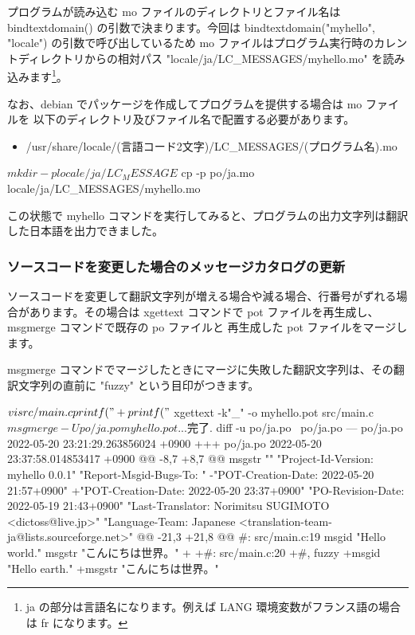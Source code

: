 \documentclass[mingoth,a4paper]{jsarticle}
\begin{document}
プログラムが読み込む mo ファイルのディレクトリとファイル名は bindtextdomain() の引数で決まります。今回は bindtextdomain("myhello", "locale") の引数で呼び出しているため mo ファイルはプログラム実行時のカレントディレクトリからの相対パス "locale/ja/LC\_MESSAGES/myhello.mo" を読み込みます\footnote{ja の部分は言語名になります。例えば LANG 環境変数がフランス語の場合は fr になります。}。

なお、debian でパッケージを作成してプログラムを提供する場合は mo ファイルを 以下のディレクトリ及びファイル名で配置する必要があります。

\begin{itemize}
\item /usr/share/locale/(言語コード2文字)/LC\_MESSAGES/(プログラム名).mo
\end{itemize}

\begin{commandline}
$ mkdir -p locale/ja/LC_MESSAGE
$ cp -p po/ja.mo locale/ja/LC_MESSAGES/myhello.mo  
\end{commandline}

この状態で myhello コマンドを実行してみると、プログラムの出力文字列は翻訳した日本語を出力できました。



\subsubsection{ソースコードを変更した場合のメッセージカタログの更新}

ソースコードを変更して翻訳文字列が増える場合や減る場合、行番号がずれる場合があります。その場合は xgettext コマンドで pot ファイルを再生成し、msgmerge コマンドで既存の po ファイルと 再生成した pot ファイルをマージします。

msgmerge コマンドでマージしたときにマージに失敗した翻訳文字列は、その翻訳文字列の直前に "fuzzy" という目印がつきます。

\begin{commandline}
$ vi src/main.c
     printf("%
+    printf("%
 
$ xgettext -k"_" -o myhello.pot src/main.c
$ msgmerge -U po/ja.po myhello.pot
... 完了.

$ diff -u po/ja.po~ po/ja.po
--- po/ja.po~   2022-05-20 23:21:29.263856024 +0900
+++ po/ja.po    2022-05-20 23:37:58.014853417 +0900
@@ -8,7 +8,7 @@
 msgstr ""
 "Project-Id-Version: myhello 0.0.1\n"
 "Report-Msgid-Bugs-To: \n"
-"POT-Creation-Date: 2022-05-20 21:57+0900\n"
+"POT-Creation-Date: 2022-05-20 23:37+0900\n"
 "PO-Revision-Date: 2022-05-19 21:43+0900\n"
 "Last-Translator: Norimitsu SUGIMOTO <dictoss@live.jp>\n"
 "Language-Team: Japanese <translation-team-ja@lists.sourceforge.net>\n"
@@ -21,3 +21,8 @@
 #: src/main.c:19
 msgid "Hello world."
 msgstr "こんにちは世界。"
+
+#: src/main.c:20
+#, fuzzy
+msgid "Hello earth."
+msgstr "こんにちは世界。"
\end{commandline}
\end{document}
